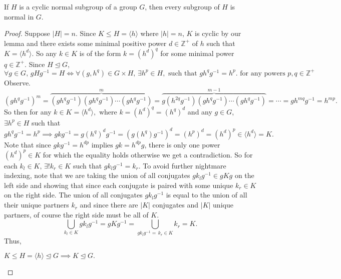 \documentclass[addpoints,10pt]{exam}
\theoremstyle{plain}
\theoremstyle{definition}
\newtheorem{prob}[thm]{Problem}
\theoremstyle{plain}
\theoremstyle{plain}
\theoremstyle{definition}
\let\oldprob\prob
\let\endoldprob\endprob
\renewenvironment{prob}
  {\begin{singlespace}\oldprob}
  {\endoldprob\end{singlespace}}
\newcommand{\ZZ}{\ensuremath{\mathbb{Z}}}
\begin{document}
\begin{prob}
  If $H$ is a cyclic normal subgroup of a group $G$, then every subgroup of $H$ is normal in $G$.
\end{prob}
\begin{proof}
  Suppose $|H|=n$. Since $K\leq H=\langle h\rangle$ where $|h|=n$, $K$ is cyclic by our lemma and there exists some minimal positive power $d \in \ZZ^{+}$ of $h$ such that $K=\langle h^{d}\rangle.$ So any $k\in K$ is of the form $k=(h^{d})^{q}$ for some minimal power $q\in \ZZ^{+}$. Since $H\trianglelefteq G$, 
  $$\forall g\in G,\,gHg^{-1}=H\iff \forall (g,h^{q})\in G\times H,\,\exists h^{p}\in H,\text{ such that }gh^{q}g^{-1}=h^{p}.\text{ for any powers }p,q\in \ZZ^{+}$$
  Observe.
    $$(gh^{q}g^{-1})^{m}=\overbrace{(gh^{q}g^{-1})(gh^{q}g^{-1})\cdots (gh^{q}g^{-1})}^{m}=\overbrace{g(h^{2q}g^{-1})(gh^{q}g^{-1})\cdots (gh^{q}g^{-1})}^{m-1}=\cdots=gh^{mq}g^{-1}=h^{mp}.$$
  So then for any $k\in K=\langle h^{d}\rangle,\text{ where }k=(h^{d})^{q}=(h^{q})^{d}$ and any $g\in G$, $\exists h^{p}\in H$ such that
    $$gh^{q}g^{-1}=h^{p}\implies gkg^{-1}=g(h^{q})^{d}g^{-1}=(g(h^{q})g^{-1})^{d}=(h^{p})^{d}=(h^{d})^{p}\in \langle h^{d}\rangle=K.$$
  Note that since $gkg^{-1}=h^{dp}\text{ implies }gk=h^{dp}g$, there is only one power $(h^{d})^{p}\in K$ for which the equality holds otherwise we get a contradiction. So for each $k_{l}\in K,\,\exists! k_{r}\in K$ such that $gk_{l}g^{-1}=k_{r}$. To avoid further nightmare indexing, note that we are taking the union of all conjugates $gk_{l}g^{-1}\in gKg$ on the left side and showing that since each conjugate is paired with some unique $k_{r}\in K$ on the right side. The union of all conjugates $gk_{l}g^{-1}$ is equal to the union of all their unique partners $k_{r}$ and since there are $|K|$ conjugates and $|K|$ unique partners, of course the right side must be all of $K$.
  $$\bigcup_{k_{l}\in K}gk_{l}g^{-1}=gKg^{-1}=\bigcup_{gk_{l}g^{-1}=\,k_{r}\in K} k_{r}=K.$$
  Thus,
  \begin{center}
    $K\leq H=\langle h\rangle\trianglelefteq G\implies K\trianglelefteq G.$
  \end{center}

\end{proof}
\newpage
\setcounter{thm}{20}   %
\end{document}
